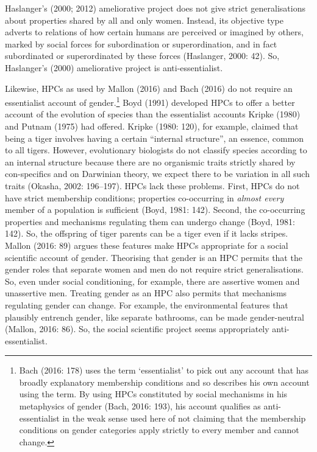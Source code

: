 Haslanger's (2000; 2012) ameliorative project does not give strict
generalisations about properties shared by all and only women. Instead,
its objective type adverts to relations of how certain humans are
perceived or imagined by others, marked by social forces for
subordination or superordination, and in fact subordinated or
superordinated by these forces (Haslanger, 2000: 42). So, Haslanger's
(2000) ameliorative project is anti-essentialist.

Likewise, HPCs as used by Mallon (2016) and Bach (2016) do not require
an essentialist account of gender.\footnote{Bach (2016: 178) uses the
  term `essentialist' to pick out any account that has broadly
  explanatory membership conditions and so describes his own account
  using the term. By using HPCs constituted by social mechanisms in his
  metaphysics of gender (Bach, 2016: 193), his account qualifies as
  anti-essentialist in the weak sense used here of not claiming that the
  membership conditions on gender categories apply strictly to every
  member and cannot change.} Boyd (1991) developed HPCs to offer a
better account of the evolution of species than the essentialist
accounts Kripke (1980) and Putnam (1975) had offered. Kripke (1980:
120), for example, claimed that being a tiger involves having a certain
``internal structure'', an essence, common to all tigers. However,
evolutionary biologists do not classify species according to an internal
structure because there are no organismic traits strictly shared by
con-specifics and on Darwinian theory, we expect there to be variation
in all such traits (Okasha, 2002: 196--197). HPCs lack these problems.
First, HPCs do not have strict membership conditions; properties
co-occurring in \emph{almost every} member of a population is sufficient
(Boyd, 1981: 142). Second, the co-occurring properties and mechanisms
regulating them can undergo change (Boyd, 1981: 142). So, the offspring
of tiger parents can be a tiger even if it lacks stripes. Mallon (2016:
89) argues these features make HPCs appropriate for a social scientific
account of gender. Theorising that gender is an HPC permits that the
gender roles that separate women and men do not require strict
generalisations. So, even under social conditioning, for example, there
are assertive women and unassertive men. Treating gender as an HPC also
permits that mechanisms regulating gender can change. For example, the
environmental features that plausibly entrench gender, like separate
bathrooms, can be made gender-neutral (Mallon, 2016: 86). So, the social
scientific project seems appropriately anti-essentialist.

